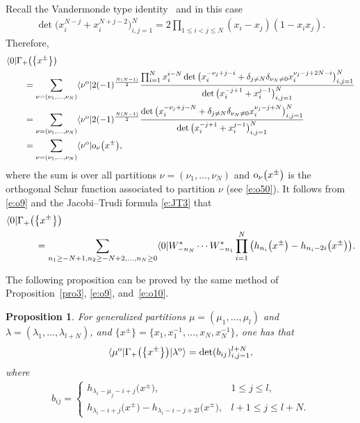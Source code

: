 \documentclass[10pt,a4paper]{amsart}
\numberwithin{equation}{section}
\newtheorem{Proposition}[Theorem]{Proposition}
 { \theoremstyle{definition}
\newtheorem{Definition}[Theorem]{Definition}
\newtheorem{Note}[Theorem]{Note}
\newtheorem{Example}[Theorem]{Example}
\newtheorem{Remark}[Theorem]{Remark} }
\begin{document}
Recall the Vandermonde type identity~\cite[formula~(4.4)]{JN2015} and \cite[p.~221]{Wey1946} in this case
\begin{align*}
\det\big(x^{N-j}_i+x^{N+j-2}_i\big)^N_{i,j=1}=2\prod_{1\leq i<j\leq N} (x_i-x_j)(1-x_ix_j).
\end{align*}
Therefore,
\begin{align}
\notag&\langle 0|\Gamma_+\big(\big\{x^{\pm}\big\}\big)\\
\notag&\qquad=\sum_{\nu=(\nu_1,\dots,\nu_N)}\langle\nu^{\rm o}|2(-1)^{\frac{N(N-1)}{2}}\frac{\prod^N_{i=1}x^{i-N}_i\det\big(x^{-\nu_j+j-i}_i+\delta_{j\neq N}\delta_{\nu_N\neq 0}x^{\nu_j-j+2N-i}_i\big)^N_{i,j=1}}{\det\big(x^{-j+1}_i+x^{j-1}_i\big)^N_{i,j=1}}\\
\notag&\qquad=\sum_{\nu=(\nu_1,\dots,\nu_N)}\langle\nu^{\rm o}|2(-1)^{\frac{N(N-1)}{2}}\frac{\det\big(x^{-\nu_j+j-N}_i+\delta_{j\neq N}\delta_{\nu_N\neq 0}x^{\nu_j-j+N}_i\big)^N_{i,j=1}}{\det\big(x^{-j+1}_i+x^{j-1}_i\big)^N_{i,j=1}}\\
\label{e:o11}&\qquad=\sum_{\nu=(\nu_1,\dots,\nu_N)}\langle\nu^{\rm o}|{\rm o}_\nu\big(x^{\pm}\big),
\end{align}
where the sum is over all partitions $\nu=(\nu_1,\dots,\nu_N)$ and ${\rm o}_\nu\big(x^{\pm}\big)$ is the orthogonal Schur function associated to partition $\nu$ (see \eqref{e:o50}). It follows from \eqref{e:o9} and the Jacobi--Trudi formula \eqref{e:JT3} that
\begin{align}
\notag&\langle 0|\Gamma_+\big(\big\{x^{\pm}\big\}\big)\\
&\quad\qquad{}=\sum_{n_1\geq -N+1,n_2\geq -N+2,\dots,n_N\geq 0}
\langle 0|W^*_{-n_N}\cdots W^*_{-n_1}\prod^N_{i=1}\big(h_{n_i}\big(x^{\pm}\big)-h_{n_i-2i}\big(x^{\pm}\big)\big).\label{e:o10}
\end{align}

The following proposition can be proved by the same method of Proposition~\ref{pro3}, \eqref{e:o9}, and~\eqref{e:o10}.

\begin{Proposition}%
For generalized partitions $\mu=(\mu_1,\dots,\mu_l)$ and $\lambda=(\lambda_1,\dots,\lambda_{l+N})$, and $\big\{x^{\pm}\big\}=\big\{x_1, x_1^{-1}, \ldots, x_N, x_N^{-1}\big\}$, one has that
\begin{align}
\label{e:sk5}\langle\mu^{\rm o}|\Gamma_+\big(\big\{x^{\pm}\big\}\big)|\lambda^{\rm o}\rangle = \det(b_{ij})^{l+N}_{i,j=1},
\end{align}
where
\begin{align*}
b_{ij}=\begin{cases}
h_{\lambda_i-\mu_j-i+j}\big(x^{\pm}\big), &1\leq j\leq l,\\
h_{\lambda_i-i+j}\big(x^{\pm}\big)-h_{\lambda_i-i-j+2l}\big(x^{\pm}\big), & l+1\leq j\leq l+N.
\end{cases}
\end{align*}
\end{Proposition}
\end{document}
